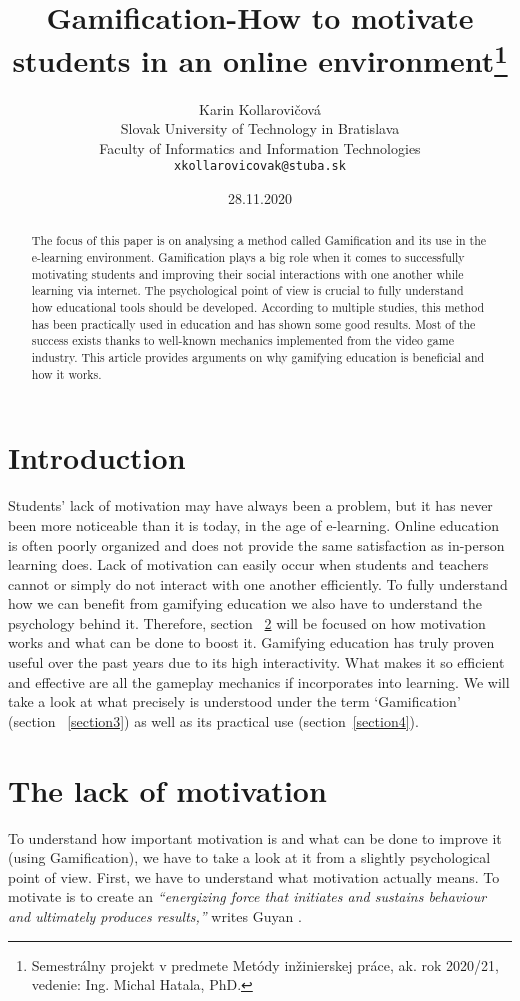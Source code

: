 \documentclass[10pt,english,a4paper]{article}
\title{Gamification-How to motivate students in an online environment\thanks{Semestrálny projekt v predmete Metódy inžinierskej práce, ak. rok 2020/21, vedenie: Ing. Michal Hatala, PhD.}}
\author{Karin Kollarovičová\\[2pt]
	{\small Slovak University of Technology in Bratislava}\\
	{\small Faculty of Informatics and Information Technologies}\\
	{\small \texttt{xkollarovicovak@stuba.sk}}
	}
\date{\small 28.11.2020}
\begin{document}
\maketitle

\begin{abstract}
	The focus of this paper is on analysing a method called Gamification and its use in the e-learning environment. 
	Gamification plays a big role when it comes to successfully motivating students and improving their social interactions with one another while learning via internet. 
	The psychological point of view is crucial to fully understand how educational tools should be developed. 
	According to multiple studies, this method has been practically used in education and has shown some good results. 
	Most of the success exists thanks to well-known mechanics implemented from the video game industry. 
	This article provides arguments on why gamifying education is beneficial and how it works. 
\end{abstract}

\section{Introduction} \label{introduction}
	Students’ lack of motivation may have always been a problem, but it has never been more noticeable than it is today, in the age of e-learning. 
	Online education is often poorly organized and does not provide the same satisfaction as in-person learning does.
	Lack of motivation can easily occur when students and teachers cannot or simply do not interact with one another efficiently. To fully understand how we can benefit from gamifying education we also have to understand the psychology behind it. 
	Therefore, section ~\ref{section2} will be focused on how motivation works and what can be done to boost it.
	Gamifying education has truly proven useful over the past years due to its high interactivity. What makes it so efficient and effective are all the gameplay mechanics if incorporates into learning.
	We will take a look at what precisely is understood under the term ‘Gamification’ (section ~\ref{section3}) as well as its practical use (section~\ref{section4}).

\section{The lack of motivation} \label{section2}
	To understand how important motivation is and what can be done to improve it (using Gamification), we have to take a look at it from a slightly psychological point of view. First, we have to understand what motivation actually means. 
	To motivate is to create an \textit{“energizing force that initiates and sustains behaviour and ultimately produces results,”} writes Guyan \cite{Guyan}. 
\end{document}
